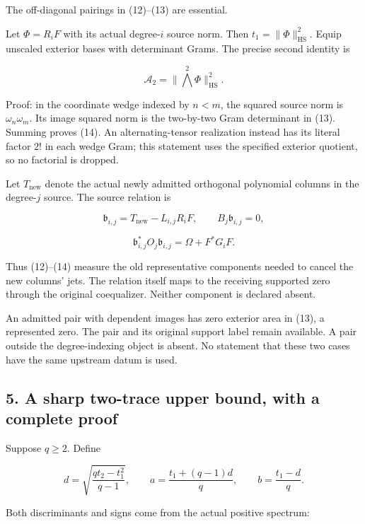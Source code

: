 \documentclass[
  11pt,
]{article}
\begin{document}
The off-diagonal pairings in (12)--(13) are essential.

Let \(\Phi=R_iF\) with its actual degree-\(i\) source norm. Then
\(t_1=\|\Phi\|_{\mathrm{HS}}^2\). Equip unscaled exterior bases with
determinant Grams. The precise second identity is

\[
 \boxed{\mathcal A_2=\|\bigwedge^2\Phi\|_{\mathrm{HS}}^2.}               \tag{14}
\]

Proof: in the coordinate wedge indexed by \(n<m\), the squared source
norm is \(\omega_n\omega_m\). Its image squared norm is the two-by-two
Gram determinant in (13). Summing proves (14). An alternating-tensor
realization instead has its literal factor \(2!\) in each wedge Gram;
this statement uses the specified exterior quotient, so no factorial is
dropped.

Let \(T_{\mathrm{new}}\) denote the actual newly admitted orthogonal
polynomial columns in the degree-\(j\) source. The source relation is

\[
 \mathfrak b_{i,j}=T_{\mathrm{new}}-L_{i,j}R_iF,
 \qquad
 B_j\mathfrak b_{i,j}=0,
\]

\[
 \boxed{\mathfrak b_{i,j}^*O_j\mathfrak b_{i,j}
 =\Omega+F^*G_iF.}                                             \tag{15}
\]

Thus (12)--(14) measure the old representative components needed to
cancel the new columns' jets. The relation itself maps to the receiving
supported zero through the original coequalizer. Neither component is
declared absent.

An admitted pair with dependent images has zero exterior area in (13), a
represented zero. The pair and its original support label remain
available. A pair outside the degree-indexing object is absent. No
statement that these two cases have the same upstream datum is used.

\subsection{5. A sharp two-trace upper bound, with a complete
proof}\label{a-sharp-two-trace-upper-bound-with-a-complete-proof}

Suppose \(q\ge2\). Define

\[
 d=\sqrt{\frac{qt_2-t_1^2}{q-1}},\qquad
 a=\frac{t_1+(q-1)d}{q},\qquad
 b=\frac{t_1-d}{q}.                                            \tag{16}
\]

Both discriminants and signs come from the actual positive spectrum:
\end{document}
